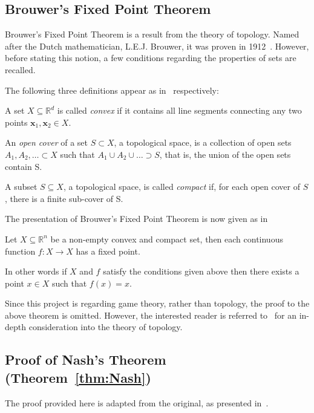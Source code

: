 \subsection{Brouwer's Fixed Point Theorem}\label{subsec:Brouwer_thm}
Brouwer's Fixed Point Theorem is a result from the theory of topology. Named
after the Dutch mathematician, L.E.J. Brouwer, it was proven in
1912~\cite{Carlson2016}. However, before stating this notion, a few conditions
regarding the properties of sets are recalled. 

The following three definitions appear as in~\cite{Weisstein, Barile, Weissteina} respectively:
\begin{definition}
    A set \(X \subseteq \mathbb{R}^{d}\) is called \textit{convex} if it
    contains all line segments connecting any two points \(\textbf{x}_{1},
    \textbf{x}_{2} \in X\).
\end{definition}

\begin{definition}
    An \textit{open cover} of a set \(S \subset X\), a topological space, is a
    collection of open sets \(A_{1}, A_{2}, \ldots \subset X\) such that
    \(A_{1} \cup A_{2} \cup \ldots \supset S\), that is, the union of the open
    sets contain S.
\end{definition}

\begin{definition}
    A subset \(S \subseteq X\), a topological space, is called \textit{compact}
    if, for each open cover of \(S\), there is a finite sub-cover of S.
\end{definition}

The presentation of Brouwer's Fixed Point Theorem is now given as in~\cite{maschler_solan_zamir_2013}
\begin{theorem}\label{thm:Brouwer}
    Let \(X \subseteq \mathbb{R}^{n}\) be a non-empty convex and compact
    set, then each continuous function \(f : X \to X\) has a fixed point.  
\end{theorem}
In other words if \(X\) and \(f\) satisfy the conditions given above then there
exists a point \(x \in X\) such that \(f(x) = x\). 

Since this project is regarding game theory, rather than topology, the proof to
the above theorem is omitted. However, the interested reader is referred
to~\cite{} for an in-depth consideration into the theory of topology.

\subsection{Proof of Nash's Theorem (Theorem~\ref{thm:Nash})}\label{subsec:Nash_Proof}
The proof provided here is adapted from the original, as presented
in~\cite{nash1951non}.

